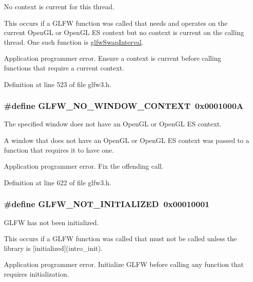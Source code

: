 No context is current for this thread. 

This occurs if a GLFW function was called that needs and operates on the current OpenGL or OpenGL ES context but no context is current on the calling thread. One such function is \hyperlink{group__context_g12a595c06947cec4967c6e1f14210a8a}{glfwSwapInterval}.

Application programmer error. Ensure a context is current before calling functions that require a current context. 

Definition at line 523 of file glfw3.h.\hypertarget{group__errors_gcff24d2757da752ae4c80bf452356487}{
\subsubsection[GLFW\_\-NO\_\-WINDOW\_\-CONTEXT]{\setlength{\rightskip}{0pt plus 5cm}\#define GLFW\_\-NO\_\-WINDOW\_\-CONTEXT~0x0001000A}}
\label{group__errors_gcff24d2757da752ae4c80bf452356487}


The specified window does not have an OpenGL or OpenGL ES context. 

A window that does not have an OpenGL or OpenGL ES context was passed to a function that requires it to have one.

Application programmer error. Fix the offending call. 

Definition at line 622 of file glfw3.h.\hypertarget{group__errors_g2374ee02c177f12e1fa76ff3ed15e14a}{
\subsubsection[GLFW\_\-NOT\_\-INITIALIZED]{\setlength{\rightskip}{0pt plus 5cm}\#define GLFW\_\-NOT\_\-INITIALIZED~0x00010001}}
\label{group__errors_g2374ee02c177f12e1fa76ff3ed15e14a}


GLFW has not been initialized. 

This occurs if a GLFW function was called that must not be called unless the library is \mbox{[}initialized\mbox{]}(intro\_\-init).

Application programmer error. Initialize GLFW before calling any function that requires initialization. 

